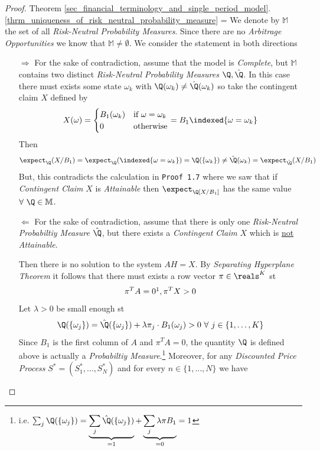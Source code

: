 \documentclass[11pt,a4paper]{article}
\begin{document}
  \begin{proof}{Theorem \ref{sec_financial_terminology_and_single_period_model}.\ref{thrm_uniqueness_of_risk_neutral_probability_measure}}
    \everymath={\displaystyle}
    We denote by $\mathbb{M}$ the set of all \textit{Risk-Neutral Probability Measures}. Since there are no \textit{Arbitrage Opportunities} we know that $\mathbb{M}\neq\emptyset$.
    We consider the statement in both directions
    \begin{itemize}
      \item[$\Longrightarrow$] For the sake of contradiction, assume that the model is \textit{Complete}, but $\mathbb{M}$ contains two distinct \textit{Risk-Neutral Probability Measures} $\Q,\hat\Q$. In this case there must exists some state $\omega_k$ with $\Q(\omega_k)\neq\hat\Q(\omega_k)$ so take the contingent claim $X$ defined by
      \[ X(\omega)=\begin{cases}B_1(\omega_k)&\text{if }\omega=\omega_k\\0&\text{otherwise}\end{cases}=B_1\indexed\{\omega=\omega_k\} \]
      Then
      \[ \expect_\Q(X/B_1)=\expect_\Q(\indexed\{\omega=\omega_k\})=\Q(\{\omega_k\})\neq\hat\Q(\omega_k)=\expect_{\hat\Q}(X/B_1) \]
      But, this contradicts the calculation in \texttt{Proof 1.7} where we saw that if \textit{Contingent Claim} $X$ is \textit{Attainable} then $\expect_\Q[X/B_1]$ has the same value $\forall\ \Q\in \mathbb{M}$.
      \item[$\Longleftarrow$] For the sake of contradiction, assume that there is only one \textit{Risk-Neutral Probabiltiy Measure} $\hat\Q$, but there exists a \textit{Contingent Claim} $X$ which is \underline{not} \textit{Attainable}.
      \par Then there is no solution to the system $AH=X$. By \textit{Separating Hyperplane Theorem} it follows that there must exists a row vector $\pi\in\reals^K$ st
      \[ \pi^TA=0\footnotemark,\pi^TX>0 \] 
      Let $\lambda>0$ be small enough st
      \[ \Q(\{\omega_j\})=\hat\Q(\{\omega_j\})+\lambda\pi_j\cdot B_1(\omega_j)>0\ \forall\ j\in\{1,\dots,K\} \]
      Since $B_1$ is the first column of $A$ and $\pi^TA=0$, the quantity $\Q$ is defined above is actually a \textit{Probabiltiy Measure}.\footnote{i.e. $\sum_j\Q(\{\omega_j\})=\underbrace{\sum_j\hat\Q(\{\omega_j\})}_{=1}+\underbrace{\sum_j\lambda\pi B_1}_{=0}=1$}
      Moreover, for any \textit{Discounted Price Process} $S^*=(S_1^*,\dots,S_N^*)$ and for every $n\in\{1,\dots,N\}$ we have

\end{itemize}
\end{proof}
\end{document}
